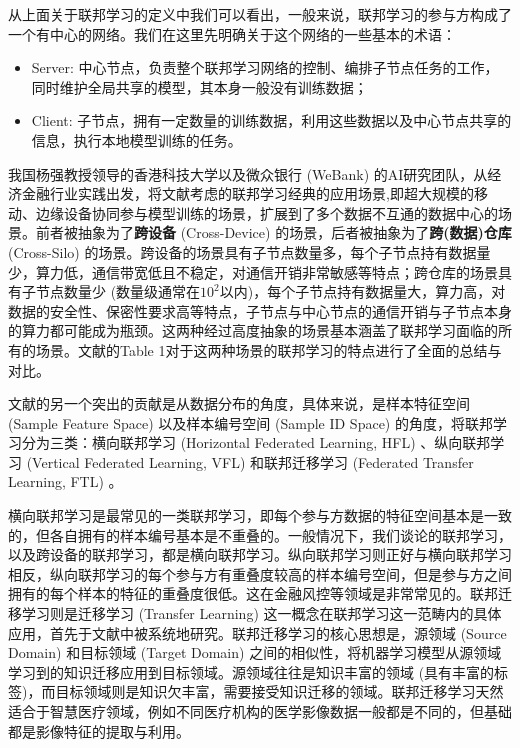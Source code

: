 从上面关于联邦学习的定义中我们可以看出，一般来说，联邦学习的参与方构成了一个有中心的网络。我们在这里先明确关于这个网络的一些基本的术语：
\begin{itemize}
    \item Server: 中心节点，负责整个联邦学习网络的控制、编排子节点任务的工作，同时维护全局共享的模型，其本身一般没有训练数据；
    \item Client: 子节点，拥有一定数量的训练数据，利用这些数据以及中心节点共享的信息，执行本地模型训练的任务。
\end{itemize}

我国杨强教授领导的香港科技大学以及微众银行 (WeBank) 的AI研究团队，从经济金融行业实践出发，将文献\parencite{mcmahan2017fed_avg}考虑的联邦学习经典的应用场景,即超大规模的移动、边缘设备协同参与模型训练的场景，扩展到了多个数据不互通的数据中心的场景\cite{Yang_2019_VFL}。前者被抽象为了\textbf{跨设备} (Cross-Device) 的场景，后者被抽象为了\textbf{跨(数据)仓库} (Cross-Silo) 的场景\cite{kairouz2019advances_fl}。跨设备的场景具有子节点数量多，每个子节点持有数据量少，算力低，通信带宽低且不稳定，对通信开销非常敏感等特点；跨仓库的场景具有子节点数量少 (数量级通常在$10^2$以内)，每个子节点持有数据量大，算力高，对数据的安全性、保密性要求高等特点，子节点与中心节点的通信开销与子节点本身的算力都可能成为瓶颈。这两种经过高度抽象的场景基本涵盖了联邦学习面临的所有的场景。文献\parencite{kairouz2019advances_fl}的Table 1对于这两种场景的联邦学习的特点进行了全面的总结与对比。

文献\parencite{Yang_2019_VFL}的另一个突出的贡献是从数据分布的角度，具体来说，是样本特征空间 (Sample Feature Space) 以及样本编号空间 (Sample ID Space) 的角度，将联邦学习分为三类：横向联邦学习 (Horizontal Federated Learning, HFL) 、纵向联邦学习 (Vertical Federated Learning, VFL) 和联邦迁移学习 (Federated Transfer Learning, FTL) 。

横向联邦学习是最常见的一类联邦学习，即每个参与方数据的特征空间基本是一致的，但各自拥有的样本编号基本是不重叠的。一般情况下，我们谈论的联邦学习，以及跨设备的联邦学习，都是横向联邦学习。纵向联邦学习则正好与横向联邦学习相反，纵向联邦学习的每个参与方有重叠度较高的样本编号空间，但是参与方之间拥有的每个样本的特征的重叠度很低。这在金融风控等领域是非常常见的。联邦迁移学习则是迁移学习 (Transfer Learning) 这一概念在联邦学习这一范畴内的具体应用，首先于文献\parencite{liu_2020_transfer_fl}中被系统地研究。联邦迁移学习的核心思想是，源领域 (Source Domain) 和目标领域 (Target Domain) 之间的相似性，将机器学习模型从源领域学习到的知识迁移应用到目标领域。源领域往往是知识丰富的领域 (具有丰富的标签)，而目标领域则是知识欠丰富，需要接受知识迁移的领域。联邦迁移学习天然适合于智慧医疗领域，例如不同医疗机构的医学影像数据一般都是不同的，但基础都是影像特征的提取与利用。

